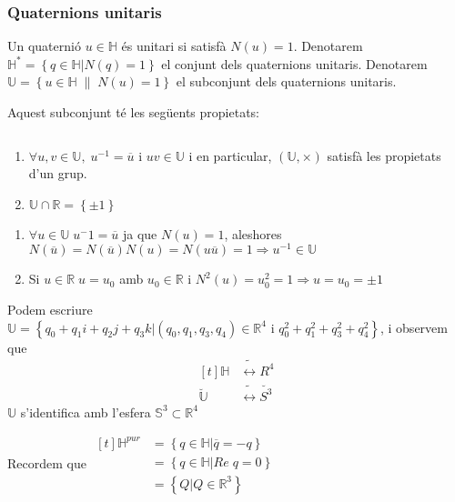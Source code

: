 \documentclass[../main.tex]{subfiles}
\begin{document}
	\subsubsection{Quaternions unitaris}
	\begin{definicio}
		Un quaternió $u \in \mathbb{H}$ és unitari si satisfà $N(u) = 1$. Denotarem $\mathbb{H}^* = \left\{q \in \mathbb{H} | N(q) = 1\right\}$ el conjunt dels quaternions unitaris.
		Denotarem $\mathbb{U} = \left\{u \in \mathbb{H}\;\|\;N(u) = 1\right\}$ el subconjunt dels quaternions unitaris.
	\end{definicio}
	Aquest subconjunt té les següents propietats:
	\begin{proposicio} $\;$
		\begin{enumerate}
			\item $\forall u, v \in \mathbb{U},\;u^{-1} = \overline{u}$ i $uv \in \mathbb{U}$ i en particular,
			$(\mathbb{U}, \times)$ satisfà les propietats d'un grup.
			\item $\mathbb{U} \cap \mathbb{R} = \left\{\pm 1\right\}$
		\end{enumerate}
	\end{proposicio}
	\begin{demostracio}
		\begin{enumerate}
			\item $\forall u \in \mathbb{U}\; u^-1 = \overline{u}$ ja que $N(u) = 1$, aleshores $N(\overline{u}) = N(\overline{u})N(u) = N(u\overline{u}) = 1 \Rightarrow u^{-1}\in \mathbb{U}$
			\item Si $u \in \mathbb{R}\;u = u_0$ amb $u_0 \in \mathbb{R}$ i $N^2(u) = u_0^2 = 1 \Rightarrow u = u_0 = \pm 1$
		\end{enumerate}
	\end{demostracio}
	\begin{obs}
		Podem escriure $\mathbb{U} = \left\{q_0+q_1i+q_2j+q_3k | (q_0, q_1, q_3, q_4) \in \mathbb{R}^4\text{ i } q_0^2 + q_1^2 + q_3^2 + q_4^2 \right\}$,
		i observem que
		\begin{displaymath}
			\begin{aligned}[t]
				\mathbb{H} &\tilde{\longleftrightarrow} R^4\\
				\breve{\mathbb{U}} &\tilde{\longleftrightarrow} \breve{S^3}
			\end{aligned}
		\end{displaymath}
		$\mathbb{U}$ s'identifica amb l'esfera $\mathbb{S}^3 \subset \mathbb{R}^4$
	\end{obs}
	Recordem que $\begin{aligned}[t]
					\mathbb{H}^{pur} &= \left\{q \in \mathbb{H} | \overline{q} = -q\right\}\\
									 &= \left\{q \in \mathbb{H} | Re\;q = 0\right\}\\
									 &= \left\{Q | Q \in \mathbb{R}^3\right\}
				  \end{aligned}$
\end{document}
